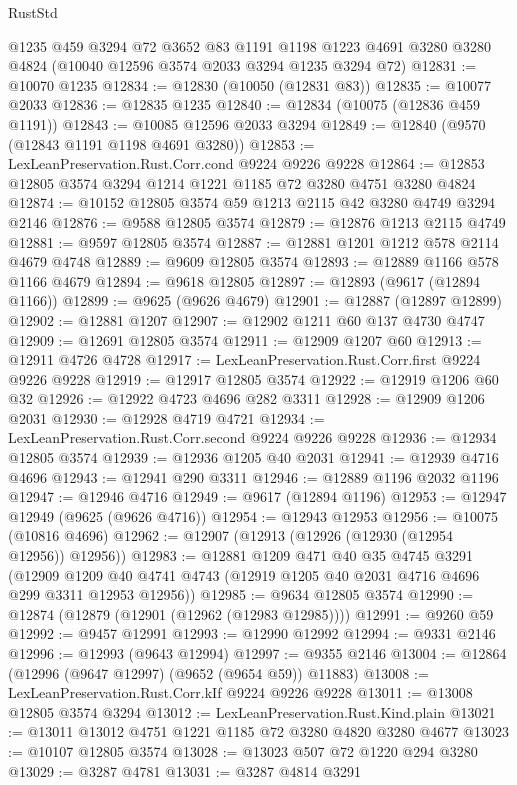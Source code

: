 \begin{lexlean}{RustStd}
\begin{coremodule}
{\begin{coremodule}
{{{{{{{{{{{{{{{{{{{{{{{{{{{{{{{{{    @1235
    @459
    @3294
    @72
    @3652
    @83
    @1191
    @1198
    @1223
    @4691
    @3280
    @3280
    @4824
    (@10040 @12596 @3574 @2033 @3294 @1235 @3294 @72)
@12831 := @10070 @1235
@12834 := @12830 (@10050 (@12831 @83))
@12835 := @10077 @2033
@12836 := @12835 @1235
@12840 := @12834 (@10075 (@12836 @459 @1191))
@12843 := @10085 @12596 @2033 @3294
@12849 := @12840 (@9570 (@12843 @1191 @1198 @4691 @3280))
@12853 := LexLeanPreservation.Rust.Corr.cond @9224 @9226 @9228
@12864 := @12853 @12805 @3574 @3294 @1214 @1221 @1185 @72 @3280 @4751 @3280 @4824
@12874 := @10152 @12805 @3574 @59 @1213 @2115 @42 @3280 @4749 @3294 @2146
@12876 := @9588 @12805 @3574
@12879 := @12876 @1213 @2115 @4749
@12881 := @9597 @12805 @3574
@12887 := @12881 @1201 @1212 @578 @2114 @4679 @4748
@12889 := @9609 @12805 @3574
@12893 := @12889 @1166 @578 @1166 @4679
@12894 := @9618 @12805
@12897 := @12893 (@9617 (@12894 @1166))
@12899 := @9625 (@9626 @4679)
@12901 := @12887 (@12897 @12899)
@12902 := @12881 @1207
@12907 := @12902 @1211 @60 @137 @4730 @4747
@12909 := @12691 @12805 @3574
@12911 := @12909 @1207 @60
@12913 := @12911 @4726 @4728
@12917 := LexLeanPreservation.Rust.Corr.first @9224 @9226 @9228
@12919 := @12917 @12805 @3574
@12922 := @12919 @1206 @60 @32
@12926 := @12922 @4723 @4696 @282 @3311
@12928 := @12909 @1206 @2031
@12930 := @12928 @4719 @4721
@12934 := LexLeanPreservation.Rust.Corr.second @9224 @9226 @9228
@12936 := @12934 @12805 @3574
@12939 := @12936 @1205 @40 @2031
@12941 := @12939 @4716 @4696
@12943 := @12941 @290 @3311
@12946 := @12889 @1196 @2032 @1196
@12947 := @12946 @4716
@12949 := @9617 (@12894 @1196)
@12953 := @12947 @12949 (@9625 (@9626 @4716))
@12954 := @12943 @12953
@12956 := @10075 (@10816 @4696)
@12962 := @12907 (@12913 (@12926 (@12930 (@12954 @12956)) @12956))
@12983 := @12881
    @1209
    @471
    @40
    @35
    @4745
    @3291
    (@12909 @1209 @40 @4741 @4743 (@12919 @1205 @40 @2031 @4716 @4696 @299 @3311 @12953 @12956))
@12985 := @9634 @12805 @3574
@12990 := @12874 (@12879 (@12901 (@12962 (@12983 @12985))))
@12991 := @9260 @59
@12992 := @9457 @12991
@12993 := @12990 @12992
@12994 := @9331 @2146
@12996 := @12993 (@9643 @12994)
@12997 := @9355 @2146
@13004 := @12864 (@12996 (@9647 @12997) (@9652 (@9654 @59)) @11883)
@13008 := LexLeanPreservation.Rust.Corr.kIf @9224 @9226 @9228
@13011 := @13008 @12805 @3574 @3294
@13012 := LexLeanPreservation.Rust.Kind.plain
@13021 := @13011 @13012 @4751 @1221 @1185 @72 @3280 @4820 @3280 @4677
@13023 := @10107 @12805 @3574
@13028 := @13023 @507 @72 @1220 @294 @3280
@13029 := @3287 @4781
@13031 := @3287 @4814 @3291
}}}}}}}}}}}}}}}}}}}}}}}}}}}}}}}}}
\end{coremodule}}
\end{coremodule}
\end{lexlean}
